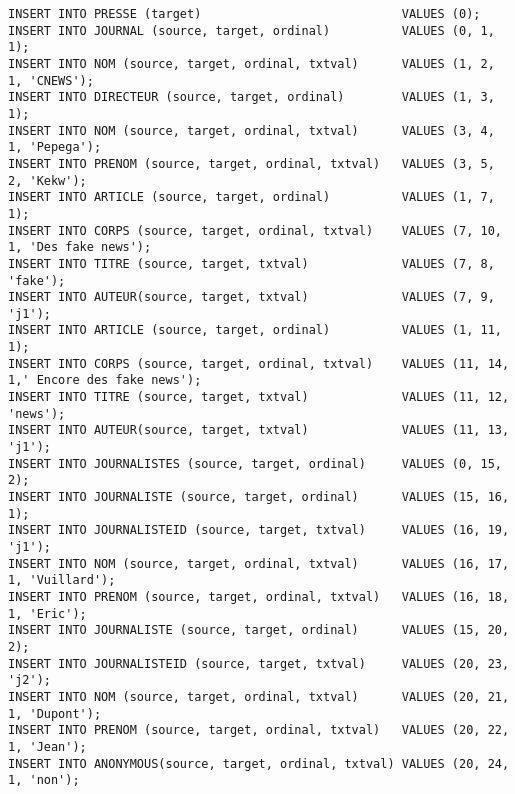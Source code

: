 \begin{verbatim}
INSERT INTO PRESSE (target)                            VALUES (0);
INSERT INTO JOURNAL (source, target, ordinal)          VALUES (0, 1, 1);
INSERT INTO NOM (source, target, ordinal, txtval)      VALUES (1, 2, 1, 'CNEWS');
INSERT INTO DIRECTEUR (source, target, ordinal)        VALUES (1, 3, 1);
INSERT INTO NOM (source, target, ordinal, txtval)      VALUES (3, 4, 1, 'Pepega');
INSERT INTO PRENOM (source, target, ordinal, txtval)   VALUES (3, 5, 2, 'Kekw');
INSERT INTO ARTICLE (source, target, ordinal)          VALUES (1, 7, 1);
INSERT INTO CORPS (source, target, ordinal, txtval)    VALUES (7, 10, 1, 'Des fake news');
INSERT INTO TITRE (source, target, txtval)             VALUES (7, 8, 'fake');
INSERT INTO AUTEUR(source, target, txtval)             VALUES (7, 9, 'j1');
INSERT INTO ARTICLE (source, target, ordinal)          VALUES (1, 11, 1);
INSERT INTO CORPS (source, target, ordinal, txtval)    VALUES (11, 14, 1,' Encore des fake news');
INSERT INTO TITRE (source, target, txtval)             VALUES (11, 12, 'news');
INSERT INTO AUTEUR(source, target, txtval)             VALUES (11, 13, 'j1');
INSERT INTO JOURNALISTES (source, target, ordinal)     VALUES (0, 15, 2);
INSERT INTO JOURNALISTE (source, target, ordinal)      VALUES (15, 16, 1);
INSERT INTO JOURNALISTEID (source, target, txtval)     VALUES (16, 19, 'j1');
INSERT INTO NOM (source, target, ordinal, txtval)      VALUES (16, 17, 1, 'Vuillard');
INSERT INTO PRENOM (source, target, ordinal, txtval)   VALUES (16, 18, 1, 'Eric');
INSERT INTO JOURNALISTE (source, target, ordinal)      VALUES (15, 20, 2);
INSERT INTO JOURNALISTEID (source, target, txtval)     VALUES (20, 23, 'j2');
INSERT INTO NOM (source, target, ordinal, txtval)      VALUES (20, 21, 1, 'Dupont');
INSERT INTO PRENOM (source, target, ordinal, txtval)   VALUES (20, 22, 1, 'Jean');
INSERT INTO ANONYMOUS(source, target, ordinal, txtval) VALUES (20, 24, 1, 'non');
\end{verbatim}

